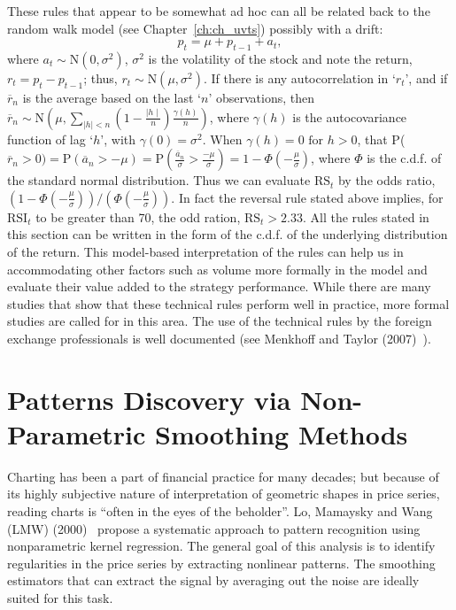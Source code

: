 These rules that appear to be somewhat ad hoc can all be related back to the random walk model (see Chapter~\ref{ch:ch_uvts}) possibly with a drift:
	\begin{equation} \label{eqn:anotherpt}
	p_t = \mu + p_{t-1} + a_t,
	\end{equation}
where $a_t \sim \text{N}(0,\sigma^2)$, $\sigma^2$ is the volatility of the stock and note the return, $r_t= p_t - p_{t-1}$; thus, $r_t \sim \text{N}(\mu,\sigma^2)$. If there is any autocorrelation in `$r_t$', and if $\overline{r}_n$ is the average based on the last `$n$' observations, then $\overline{r}_n \sim \text{N}\left(\mu,\sum_{\mid h \mid < n}\left(1-\frac{\mid h \mid}{n}\right)\frac{\gamma(h)}{n}\right)$, where $\gamma(h)$ is the autocovariance function of lag `$h$', with $\gamma(0)=\sigma^2$. When $\gamma(h)=0 \text{ for } h > 0$, that P($\overline{r}_n > 0)= \text{P}(\overline{a}_n > -\mu)= \text{P}\left( \frac{\overline{a}_n}{\sigma} > \frac{-\mu}{\sigma} \right)= 1 - \Phi\left( -\frac{\mu}{\sigma} \right)$, where $\Phi$ is the c.d.f. of the standard normal distribution. Thus we can evaluate $\text{RS}_t$ by the odds ratio, $(1 - \Phi(-\frac{\mu}{\sigma}))/(\Phi(-\frac{\mu}{\sigma}))$. In fact the reversal rule stated above implies, for $\text{RSI}_t$ to be greater than 70, the odd ration, $\text{RS}_t > 2.33$. All the rules stated in this section can be written in the form of the c.d.f. of the underlying distribution of the return. This model-based interpretation of the rules can help us in accommodating other factors such as volume more formally in the model and evaluate their value added to the strategy performance. While there are many studies that show that these technical rules perform well in practice, more formal studies are called for in this area. The use of the technical rules by the foreign exchange professionals is well documented (see Menkhoff and Taylor (2007)~\cite{MalTay}).


\section{Patterns Discovery via Non-Parametric Smoothing Methods}


Charting has been a part of financial practice for many decades; but because of its highly subjective nature of interpretation of geometric shapes in price series, reading charts is ``often in the eyes of the beholder''. Lo, Mamaysky and Wang (LMW) (2000)~\cite{LoMWang} propose a systematic approach to pattern recognition using nonparametric kernel regression. The general goal of this analysis is to identify regularities in the price series by extracting nonlinear patterns. The smoothing estimators that can extract the signal by averaging out the noise are ideally suited for this task.	



